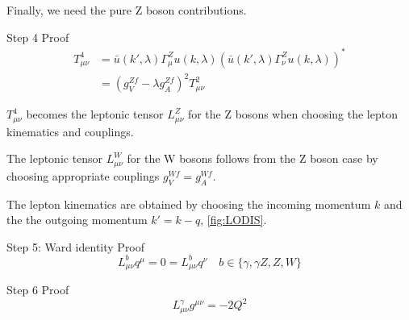 Finally, we need the pure Z boson contributions.
\begin{exercisebox}[label=box:exLOT4]{Step 4}
    Proof
    \begin{align}
        T^4_{\mu\nu} &= \bar u(k',\lambda)\Gamma^Z_\mu u(k,\lambda) \left(\bar u(k',\lambda)\Gamma^{Z}_\nu u(k,\lambda)\right)^*\\
         &= (g_V^{Z f} - \lambda g_A^{Z f})^2 T^2_{\mu\nu}
    \end{align}
\end{exercisebox}
\noindent{}$T^4_{\mu\nu}$ becomes the leptonic tensor $L_{\mu\nu}^{Z}$ for the Z bosons when choosing the lepton kinematics and couplings.

The leptonic tensor $L_{\mu\nu}^{W}$ for the W bosons follows from the Z boson case by choosing appropriate couplings $g_{V}^{W f}=g_{A}^{W f}$.

The lepton kinematics are obtained by choosing the incoming momentum $k$ and the the outgoing momentum $k' = k - q$, \cref{fig:LODIS}.
\begin{exercisebox}[label=box:exLOWard]{Step 5: Ward identity}
    Proof
    \begin{equation}
        L^b_{\mu\nu} q^\mu = 0 = L^b_{\mu\nu} q^\nu \quad b \in\{\gamma, \gamma Z, Z, W\}
    \end{equation}
\end{exercisebox}

\begin{exercisebox}[label=box:exLOg]{Step 6}
    Proof
    \begin{equation}
        L^\gamma_{\mu\nu} g^{\mu\nu} = -2 Q^2
    \end{equation}
\end{exercisebox}

